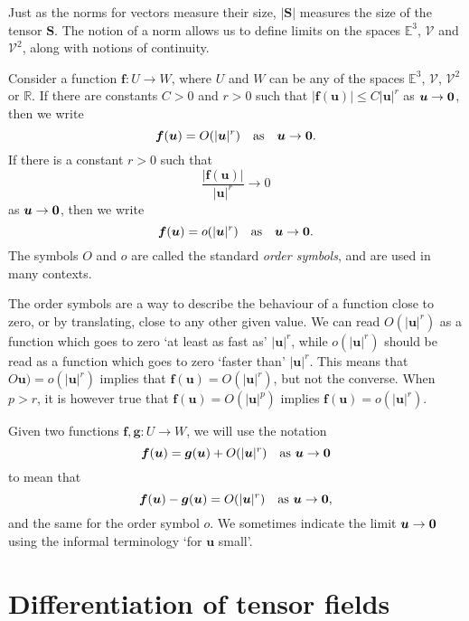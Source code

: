 \documentclass[
  letterpaper,
  DIV=11,
  numbers=noendperiod]{scrreprt}
\theoremstyle{plain}
\theoremstyle{remark}
\begin{document}
Just as the norms for vectors measure their size, \(|{\boldsymbol{S}}|\)
measures the size of the tensor \({\boldsymbol{S}}\). The notion of a
norm allows us to define limits on the spaces \({\mathbb{E}}^3\),
\({\mathcal{V}}\) and \({\mathcal{V}}^2\), along with notions of
continuity.

Consider a function \({\boldsymbol{f}}:U\to W\), where \(U\) and \(W\)
can be any of the spaces \({\mathbb{E}}^3\), \({\mathcal{V}}\),
\({\mathcal{V}}^2\) or \({\mathbb{R}}\). If there are constants \(C>0\)
and \(r>0\) such that
\(|{\boldsymbol{f}}({\boldsymbol{u}})|\leq C|{\boldsymbol{u}}|^r\) as
\({\boldsymbol{u}}\to\bf0\), then we write
\[{\boldsymbol{f}}({\boldsymbol{u}}) = {O}(|{\boldsymbol{u}}|^r)\quad\text{as}\quad{\boldsymbol{u}}\to\bf0.\]
If there is a constant \(r>0\) such that
\[\frac{|{\boldsymbol{f}}({\boldsymbol{u}})|}{|{\boldsymbol{u}}|^r}\to0\]
as \({\boldsymbol{u}}\to\bf0\), then we write
\[{\boldsymbol{f}}({\boldsymbol{u}})={o}(|{\boldsymbol{u}}|^r)\quad\text{as}\quad{\boldsymbol{u}}\to\bf0.\]
The symbols \({O}\) and \({o}\) are called the standard \emph{order
symbols}, and are used in many contexts.

The order symbols are a way to describe the behaviour of a function
close to zero, or by translating, close to any other given value. We can
read \({O}(|{\boldsymbol{u}}|^r)\) as a function which goes to zero `at
least as fast as' \(|{\boldsymbol{u}}|^r\), while
\({o}(|{\boldsymbol{u}}|^r)\) should be read as a function which goes to
zero `faster than' \(|{\boldsymbol{u}}|^r\). This means that
\({O}{\boldsymbol{u}})={o}(|{\boldsymbol{u}}|^r)\) implies that
\({\boldsymbol{f}}({\boldsymbol{u}})={O}(|{\boldsymbol{u}}|^r)\), but
not the converse. When \(p>r\), it is however true that
\({\boldsymbol{f}}({\boldsymbol{u}})={O}(|{\boldsymbol{u}}|^p)\) implies
\({\boldsymbol{f}}({\boldsymbol{u}})={o}(|{\boldsymbol{u}}|^r)\).

Given two functions \({\boldsymbol{f}},{\boldsymbol{g}}:U\to W\), we
will use the notation
\[{\boldsymbol{f}}({\boldsymbol{u}}) = {\boldsymbol{g}}({\boldsymbol{u}})+{O}(|{\boldsymbol{u}}|^r)\quad\text{as }{\boldsymbol{u}}\to\bf0\]
to mean that
\[{\boldsymbol{f}}({\boldsymbol{u}}) - {\boldsymbol{g}}({\boldsymbol{u}}) = {O}(|{\boldsymbol{u}}|^r)\quad\text{as }{\boldsymbol{u}}\to\bf0,\]
and the same for the order symbol \({o}\). We sometimes indicate the
limit \({\boldsymbol{u}}\to\bf0\) using the informal terminology `for
\({\boldsymbol{u}}\) small'.

\section{Differentiation of tensor
fields}\label{differentiation-of-tensor-fields}
\end{document}
